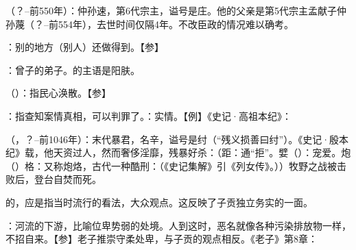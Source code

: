 {
\item {}（？--前550年）：仲孙速，第6代宗主，谥号是庄。他的父亲是第5代宗主孟献子仲孙蔑（？--前554年），去世时间仅隔4年。不改臣政的情况难以确考。
\item {}：别的地方（别人）还做得到。【参】
}
{}


{
\item {}：曾子的弟子。的主语是阳肤。
\item {}（）：指民心涣散。【参】 
\item {}：指查知案情真相，可以判罪了。：实情。【例】《史记·高祖本纪》：
}
{} %


{
\item {}（，？--前1046年）：末代暴君，名辛，谥号是纣（“残义损善曰纣”）。《史记·殷本纪》载，他天资过人，然而奢侈淫靡，残暴好杀：（距：通“拒”。嬖（）：宠爱。炮（）格：又称炮烙，古代一种酷刑：（《史记集解》引《列女传》。））牧野之战被击败后，登台自焚而死。
\item {}的，应是指当时流行的看法，大众观点。这反映了子贡独立务实的一面。
\item {}：河流的下游，比喻位卑势弱的处境。人到这时，恶名就像各种污染排放物一样，不招自来。【参】老子推崇守柔处卑，与子贡的观点相反。《老子》第8章：
}
{}  %


